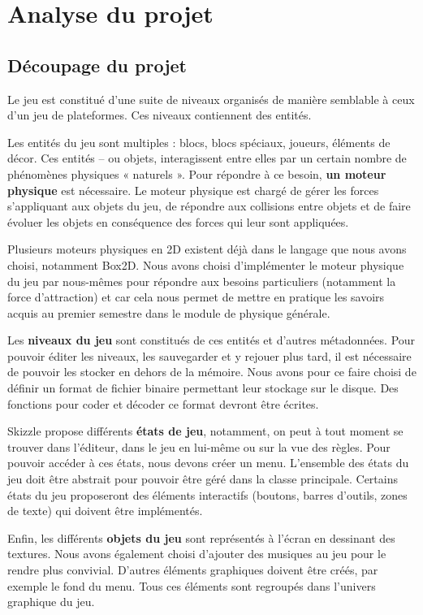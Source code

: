 \chapter{Analyse du projet}

\section{Découpage du projet}

Le jeu est constitué d'une suite de niveaux organisés de manière
semblable à ceux d'un jeu de plateformes. Ces niveaux contiennent des entités.

Les entités du jeu sont multiples : blocs, blocs spéciaux, joueurs,
éléments de décor. Ces entités -- ou objets, interagissent entre elles
par un certain nombre de phénomènes physiques « naturels ». Pour répondre
à ce besoin, \textbf{un moteur physique} est nécessaire. Le moteur physique est
chargé de gérer les forces s'appliquant aux objets du jeu, de répondre
aux collisions entre objets et de faire évoluer les objets en conséquence
des forces qui leur sont appliquées.

Plusieurs moteurs physiques en 2D existent déjà dans le langage que nous
avons choisi, notamment Box2D. \cite{analyse-box2d}
Nous avons choisi d'implémenter le moteur
physique du jeu par nous-mêmes pour répondre aux besoins particuliers
(notamment la force d'attraction) et car cela nous permet de mettre en
pratique les savoirs acquis au premier semestre dans le module
de physique générale.

Les \textbf{niveaux du jeu} sont constitués de ces entités et d'autres
métadonnées. Pour pouvoir éditer les niveaux, les sauvegarder et
y rejouer plus tard, il est nécessaire de pouvoir les stocker
en dehors de la mémoire. Nous avons pour ce faire choisi de définir
un format de fichier binaire permettant leur stockage sur le disque.
Des fonctions pour coder et décoder ce format devront être écrites.

Skizzle propose différents \textbf{états de jeu}, notamment, on peut à tout moment
se trouver dans l'éditeur, dans le jeu en lui-même ou sur la vue des règles.
Pour pouvoir accéder à ces états, nous devons créer un menu. L'ensemble
des états du jeu doit être abstrait pour pouvoir être géré dans la classe
principale. Certains états du jeu proposeront des éléments interactifs
(boutons, barres d'outils, zones de texte) qui doivent être implémentés.

Enfin, les différents \textbf{objets du jeu} sont représentés à l'écran en
dessinant des textures. Nous avons également choisi d'ajouter des musiques
au jeu pour le rendre plus convivial. D'autres éléments graphiques doivent
être créés, par exemple le fond du menu. Tous ces éléments sont regroupés
dans l'univers graphique du jeu.

